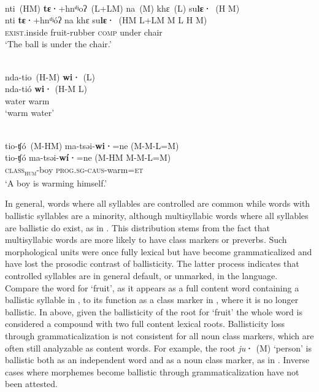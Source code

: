 \documentclass[output=paper]{langscibook}
\begin{document}
\ea\label{ex:dobui:11}
{\label{bkm:Ref124427360}\citet{ELA2012}}\\
\glll nti~(HM) \textbf{tɛ·}+hnᵈʲoʔ~(L+LM) na~(M) khɛ~(L) su\textbf{lɛ·}~{(H M)}\\
     nti       \textbf{tɛ·}+hnᵈʲóʔ        na     khɛ     su\textbf{lɛ·}~{(HM L+LM M L H M)}\\
     \textsc{exist}.inside fruit-rubber \textsc{comp} under chair\\
\glt ‘The ball is under the chair.’
\z

\ea\label{ex:dobui:12}
\ea\label{ex:dobui:12a}
{\citet[270]{Bauernschmidt2010}}\\
\glll  nda-tio~(H-M) \textbf{wi·} (L)\\
       nda-tió \textbf{wi·} (H-M L)\\
     water warm\\
\glt ‘warm water’

\ex\label{ex:dobui:12b}
{\label{bkm:Ref101351927}\citet{ELA2012}}\\
\glll tio-ʧó~(M-HM) ma-tsəi-\textbf{wi}\textbf{·}=ne (M-M-L=M) \\
   tio-ʧó        ma-tsəi-\textbf{wí}\textbf{·}=ne {(M-HM M-M-L=M)}\\
     \textsc{class}\textsc{\textsubscript{hum}}-boy \textsc{prog}.\textsc{sg}-\textsc{caus}-warm=\textsc{et}\\
\glt ‘A boy is warming himself.’
\z
\z

In general, words where all syllables are controlled are common while words with ballistic syllables are a minority, although multisyllabic words where all syllables are ballistic do exist, as in . This distribution stems from the fact that multisyllabic words are more likely to have class markers or preverbs. Such morphological units were once fully lexical but have become grammaticalized and have lost the prosodic contrast of ballisticity. The latter process indicates that controlled syllables are in general default, or unmarked, in the language. Compare the word for ‘fruit’, as it appears as a full content word containing a ballistic syllable in , to its function as a class marker in , where it is no longer ballistic. In  above, given the ballisticity of the root for ‘fruit’ the whole word is considered a compound with two full content lexical roots. Ballisticity loss through grammaticalization is not consistent for all noun class markers, which are often still analyzable as content words. For example, the root \textit{ju}\textbf{·} (M) ‘person’ is ballistic both as an independent word and as a noun class marker, as in . Inverse cases where morphemes become ballistic through grammaticalization have not been attested.
\end{document}
